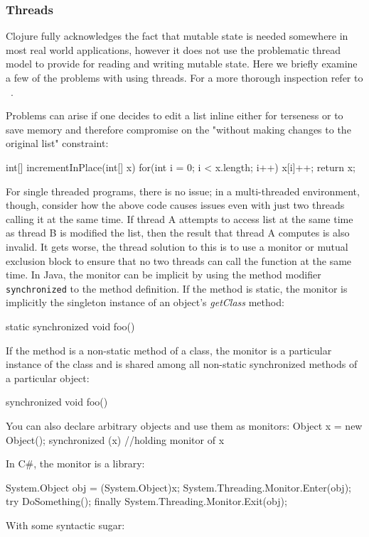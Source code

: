 \subsubsection{Threads}
Clojure fully acknowledges the fact that mutable state is needed somewhere in most real world applications, however it does not use the problematic thread model to provide for reading and writing mutable state. Here we briefly examine a few of the problems with using threads. For a more thorough inspection refer to ~\cite{1076522}.

Problems can arise if one decides to edit a list inline either for terseness or to save memory and therefore compromise on the 
"without making changes to the original list" constraint: 

int[] incrementInPlace(int[] x) {
	for(int i = 0; i < x.length; i++) { 
	  x[i]++;
         }
         return x;
}

For single threaded programs, there is no issue; in a multi-threaded environment, though, consider how the above code
causes issues even with just two threads calling it at the same time. If thread A attempts to access list at the same time as thread B is modified the list, then the result
that thread A computes is also invalid. It gets worse, the thread solution to this is to use a monitor or mutual exclusion block to ensure that no two threads can call the function at the
same time. In Java, the monitor can be implicit by using the method
modifier {\tt synchronized} to the method definition. If the method is static,
the monitor is implicitly the singleton instance of an object's {\it getClass} method:

static synchronized void foo() { }

If the method is a non-static method of a class, the monitor is a 
particular instance of the class and is shared among all non-static synchronized methods of a particular object:

synchronized void foo() { }

You can also declare arbitrary objects and use them as monitors:
Object x = new Object();
synchronized (x) {
 //holding monitor of x
}

In C\#, the monitor is a library:
 
System.Object obj = (System.Object)x;
System.Threading.Monitor.Enter(obj);
try
{
    DoSomething();
}
finally
{
    System.Threading.Monitor.Exit(obj);
} 

With some syntactic sugar:

